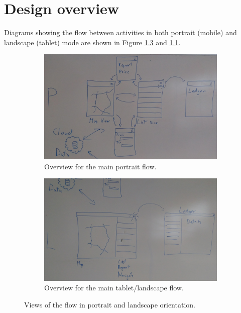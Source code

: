 
\chapter{Design overview}
Diagrams showing the flow between activities in both portrait (mobile) and landscape (tablet) mode are shown in Figure \ref{fig:l} and \ref{fig:p}.

\begin{figure}
	\centering
	\begin{subfigure}[b]{0.45\textwidth}
		\centering
		\includegraphics[width=\textwidth]{P.jpg}
		\caption{Overview for the main portrait flow.}
		\label{fig:p}
	\end{subfigure}
	\quad
	\begin{subfigure}[b]{0.45\textwidth}
		\centering
		\includegraphics[width=\textwidth]{L.jpg}
		\caption{Overview for the main tablet/landscape flow.}
		\label{fig:l}
	\end{subfigure}
	\caption{Views of the flow in portrait and landscape orientation.}
\end{figure}


